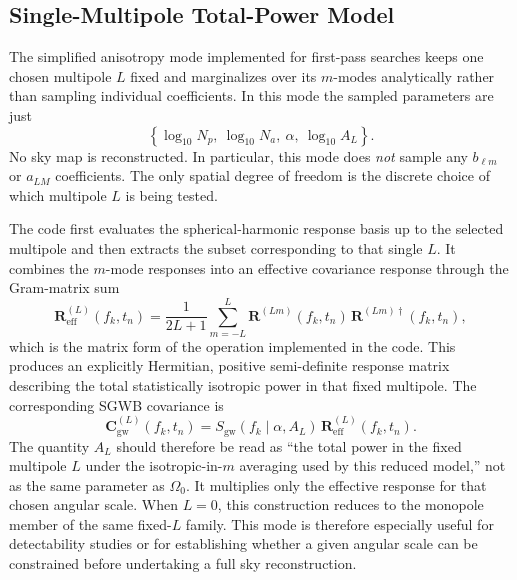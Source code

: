 \documentclass[11pt]{article}
\begin{document}
\subsection{Single-Multipole Total-Power Model}
The simplified anisotropy mode implemented for first-pass searches keeps one chosen multipole $L$ fixed and marginalizes over its $m$-modes analytically rather than sampling individual coefficients. In this mode the sampled parameters are just
\begin{equation}
\left\{\log_{10}N_p,\ \log_{10}N_a,\ \alpha,\ \log_{10}A_L\right\}.
\end{equation}
No sky map is reconstructed. In particular, this mode does \emph{not} sample any $b_{\ell m}$ or $a_{LM}$ coefficients. The only spatial degree of freedom is the discrete choice of which multipole $L$ is being tested.

The code first evaluates the spherical-harmonic response basis up to the selected multipole and then extracts the subset corresponding to that single $L$. It combines the $m$-mode responses into an effective covariance response through the Gram-matrix sum
\begin{equation}
\mathbf{R}^{(L)}_{\mathrm{eff}}(f_k,t_n)
=\frac{1}{2L+1}\sum_{m=-L}^{L}
\mathbf{R}^{(Lm)}(f_k,t_n)\,
\mathbf{R}^{(Lm)\dagger}(f_k,t_n),
\end{equation}
which is the matrix form of the operation implemented in the code. This produces an explicitly Hermitian, positive semi-definite response matrix describing the total statistically isotropic power in that fixed multipole. The corresponding SGWB covariance is
\begin{equation}
\mathbf{C}_{\mathrm{gw}}^{(L)}(f_k,t_n)
=S_{\mathrm{gw}}(f_k\mid \alpha,A_L)\,
\mathbf{R}_{\mathrm{eff}}^{(L)}(f_k,t_n).
\end{equation}
The quantity $A_L$ should therefore be read as ``the total power in the fixed multipole $L$ under the isotropic-in-$m$ averaging used by this reduced model,'' not as the same parameter as $\Omega_0$. It multiplies only the effective response for that chosen angular scale. When $L=0$, this construction reduces to the monopole member of the same fixed-$L$ family. This mode is therefore especially useful for detectability studies or for establishing whether a given angular scale can be constrained before undertaking a full sky reconstruction.
\end{document}

